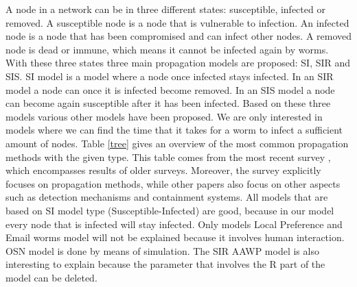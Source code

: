 A node in a network can be in three different states: susceptible, infected or removed. A susceptible node is a node that is vulnerable to infection. An infected node is a node that has been compromised and can infect other nodes. A removed node is dead or immune, which means it cannot be infected again by worms. With these three states three main propagation models are proposed: SI, SIR and SIS. SI model is a model where a node once infected stays infected. In an SIR model a node can once it is infected become removed. In an SIS model a node can become again susceptible after it has been infected. Based on these three models various other models have been proposed. We are only interested in models where we can find the time that it takes for a worm to infect a sufficient amount of nodes.
Table \ref{tree} gives an overview of the most common propagation methods with the given type. This table comes from the most recent survey \citep{wang2014modeling}, which encompasses results of older surveys. Moreover, the survey explicitly focuses on propagation methods, while other papers also focus on other aspects such as  detection mechanisms and containment systems. All models that are based on SI model type (Susceptible-Infected) are good, because in our model every node that is infected will stay infected. Only models Local Preference and Email worms model will not be explained because it involves human interaction. OSN model is done by means of simulation. The SIR AAWP model is also interesting to explain because the parameter that involves the R part of the model can be deleted.  \\








